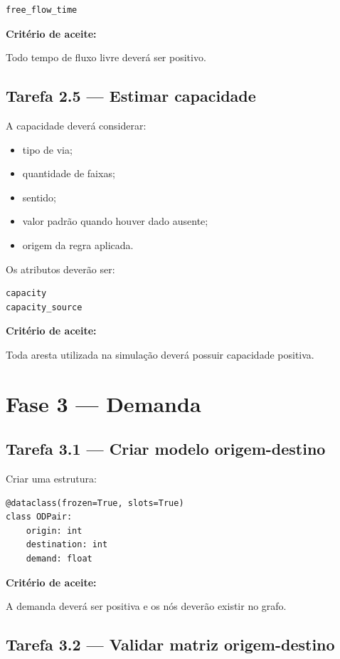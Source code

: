 \documentclass[12pt,a4paper]{article}
\begin{document}
\begin{verbatim}
free_flow_time
\end{verbatim}

\textbf{Critério de aceite:}

Todo tempo de fluxo livre deverá ser positivo.

\subsection{Tarefa 2.5 --- Estimar capacidade}

A capacidade deverá considerar:

\begin{itemize}
    \item tipo de via;
    \item quantidade de faixas;
    \item sentido;
    \item valor padrão quando houver dado ausente;
    \item origem da regra aplicada.
\end{itemize}

Os atributos deverão ser:

\begin{verbatim}
capacity
capacity_source
\end{verbatim}

\textbf{Critério de aceite:}

Toda aresta utilizada na simulação deverá possuir capacidade positiva.

\section{Fase 3 --- Demanda}

\subsection{Tarefa 3.1 --- Criar modelo origem-destino}

Criar uma estrutura:

\begin{verbatim}
@dataclass(frozen=True, slots=True)
class ODPair:
    origin: int
    destination: int
    demand: float
\end{verbatim}

\textbf{Critério de aceite:}

A demanda deverá ser positiva e os nós deverão existir no grafo.

\subsection{Tarefa 3.2 --- Validar matriz origem-destino}
\end{document}
